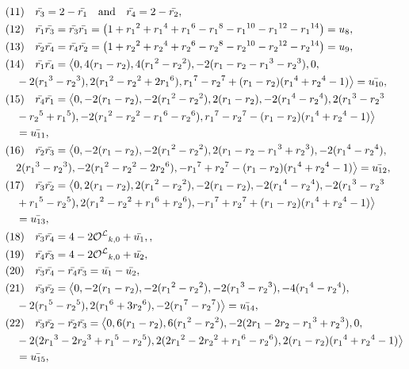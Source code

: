 \begin{lemma}
\begin{align*}
&(11)\quad \bar{r_3}=2-\bar{r_1}\quad\text{and} \quad \bar{r_4}=2-\bar{r_2},\\
&(12)\quad \bar{r_1}\bar{r_3}=\bar{r_3}\bar{r_1}=\big(1+{r_1}^2+{r_1}^4+{r_1}^6-{r_1}^8-{r_1}^{10}-{r_1}^{12}-{r_1}^{14}\big)=u_8,\\
&(13)\quad \bar{r_2}\bar{r_4}=\bar{r_4}\bar{r_2}=\big(1+{r_2}^2+{r_2}^4+{r_2}^6-{r_2}^8-{r_2}^{10}-{r_2}^{12}-{r_2}^{14}\big)=u_9,\\
&(14)\quad \bar{r_1}\bar{r_4}= \big\langle 0, 4(r_1-r_2), 4({r_1}^2-{r_2}^2), -2(r_1-r_2-{r_1}^3-{r_2}^3), 0,\\&\quad  -2({r_1}^3-{r_2}^3), 2({r_1}^2-{r_2}^2+2{r_1}^6), {r_1}^7-{r_2}^7+(r_1-r_2)({r_1}^4+{r_2}^4-1)  \big\rangle =\bar{u_{10}},\\
&(15)\quad \bar{r_4}\bar{r_1}=\big\langle 0, -2(r_1-r_2), -2({r_1}^2-{r_2}^2), 2(r_1-r_2), -2({r_1}^4-{r_2}^4), 2({r_1}^3-{r_2}^3\\&\quad -{r_2}^5+{r_1}^5), -2({r_1}^2-{r_2}^2-{r_1}^6-{r_2}^6), {r_1}^7-{r_2}^7-(r_1-r_2)({r_1}^4+{r_2}^4-1)  \big\rangle\\&\quad =\bar{u_{11}},\\
&(16)\quad \bar{r_2}\bar{r_3}=\big\langle 0, -2(r_1-r_2), -2({r_1}^2-{r_2}^2), 2(r_1-r_2-{r_1}^3+{r_2}^3), -2({r_1}^4-{r_2}^4),\\&\quad 2({r_1}^3-{r_2}^3), -2({r_1}^2-{r_2}^2-2{r_2}^6), -{r_1}^7+{r_2}^7-(r_1-r_2)({r_1}^4+{r_2}^4-1)  \big\rangle =\bar{u_{12}},\\
&(17)\quad \bar{r_3}\bar{r_2}=\big\langle 0, 2(r_1-r_2), 2({r_1}^2-{r_2}^2), -2(r_1-r_2), -2({r_1}^4-{r_2}^4), -2({r_1}^3-{r_2}^3\\&\quad+{r_1}^5-{r_2}^5), 2({r_1}^2-{r_2}^2+{r_1}^6+{r_2}^6), -{r_1}^7+{r_2}^7+(r_1-r_2)({r_1}^4+{r_2}^4-1)  \big\rangle \\&\quad=\bar{u_{13}},\\
&(18)\quad \bar{r_3}\bar{r_4}=4-2\hq_{k,0}+\bar{u_1},,\\
&(19)\quad \bar{r_4}\bar{r_3}=4-2\hq_{k,0}+\bar{u_2},\\
&(20)\quad \bar{r_3}\bar{r_4}-\bar{r_4}\bar{r_3}=\bar{u_1}-\bar{u_2},\\
&(21)\quad \bar{r_3}\bar{r_2}=\big\langle 0, -2(r_1-r_2), -2({r_1}^2-{r_2}^2), -2({r_1}^3-{r_2}^3), -4({r_1}^4-{r_2}^4),  \\&\quad-2({r_1}^5-{r_2}^5), 2({r_1}^6+3{r_2}^6), -2({r_1}^7-{r_2}^7) \big\rangle=\bar{u_{14}},\\
&(22)\quad \bar{r_3}\bar{r_2}-\bar{r_2}\bar{r_3}=\big\langle 0, 6(r_1-r_2), 6({r_1}^2-{r_2}^2), -2(2r_1-2r_2-{r_1}^3+{r_2}^3), 0, \\&\quad-2(2{r_1}^3-2{r_2}^3+{r_1}^5-{r_2}^5), 2(2{r_1}^2-2{r_2}^2+{r_1}^6-{r_2}^6), 2(r_1-r_2)({r_1}^4+{r_2}^4-1) \big\rangle\\&\quad=\bar{u_{15}},\\

\end{align*}
\end{lemma}
